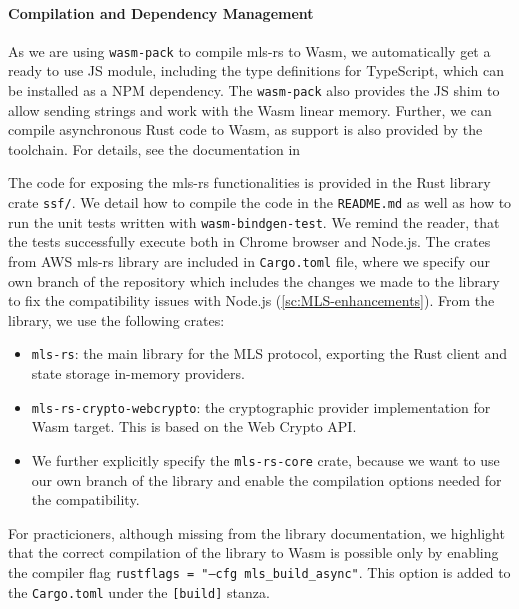 \paragraph{Compilation and Dependency Management}
As we are using \texttt{wasm-pack} to compile mls-rs to Wasm, we automatically
get a ready to use JS module, including the type definitions for TypeScript,
which can be installed as a NPM dependency. The \texttt{wasm-pack} also 
provides the JS shim to allow sending strings and work with the Wasm linear
memory. Further, we can compile asynchronous Rust code to Wasm, as support is also
provided by the toolchain. For details, see the documentation in~\cite{WasmBindgen}

The code for exposing the mls-rs functionalities is provided in the Rust library crate
\texttt{ssf/}. We detail how to compile the code in the \texttt{README.md}
as well as how to run the unit tests written with \texttt{wasm-bindgen-test}.
We remind the reader, that the tests successfully execute both in Chrome browser and Node.js.
The crates from AWS mls-rs library are included in \texttt{Cargo.toml}
file, where we specify our own branch of the repository which 
includes the changes we made to the library to fix the compatibility issues
with Node.js (\cref{sc:MLS-enhancements}). From the library, we use the following crates:
\begin{itemize}
    \item \texttt{mls-rs}: the main library for the MLS protocol, exporting the Rust client and state storage in-memory providers.
    \item \texttt{mls-rs-crypto-webcrypto}: the cryptographic provider implementation for Wasm target. This is based on the Web Crypto API.
    \item We further explicitly specify the \texttt{mls-rs-core} crate, because we want to use our own branch of the library and enable the compilation options needed for the compatibility.
\end{itemize}

For practicioners, although missing from the library documentation, we highlight that
the correct compilation of the library to Wasm is possible only by enabling the
compiler flag \texttt{rustflags = "--cfg mls\_build\_async"}. This option is added
to the \texttt{Cargo.toml} under the \texttt{[build]} stanza.


